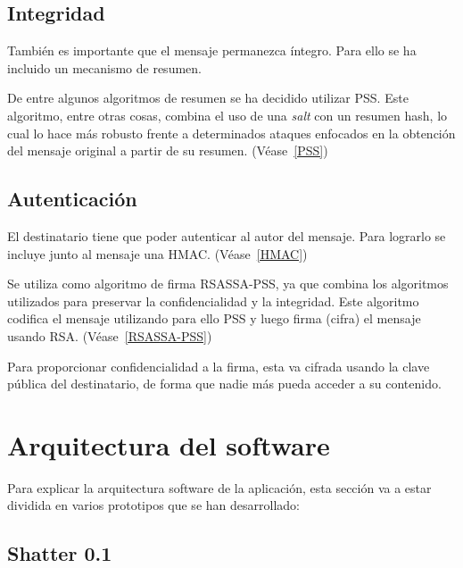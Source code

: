 \subsection{Integridad}

También es importante que el mensaje permanezca íntegro. Para ello se ha
incluido un mecanismo de resumen.

De entre algunos algoritmos de resumen se ha decidido utilizar PSS. Este
algoritmo, entre otras cosas, combina el uso de una \emph{salt} con un resumen
hash, lo cual lo hace más robusto frente a determinados ataques enfocados en la
obtención del mensaje original a partir de su resumen. (Véase~\ref{PSS})

\subsection{Autenticación}

El destinatario tiene que poder autenticar al autor del mensaje. Para lograrlo
se incluye junto al mensaje una HMAC. (Véase~\ref{HMAC})

Se utiliza como algoritmo de firma RSASSA-PSS, ya que combina los algoritmos
utilizados para preservar la confidencialidad y la integridad. Este algoritmo
codifica el mensaje utilizando para ello PSS y luego firma (cifra) el mensaje
usando RSA. (Véase~\ref{RSASSA-PSS})

Para proporcionar confidencialidad a la firma, esta va cifrada usando la clave
pública del destinatario, de forma que nadie más pueda acceder a su contenido.


\section{Arquitectura del software}

Para explicar la arquitectura software de la aplicación, esta sección va a estar dividida en varios
prototipos que se han desarrollado:

\subsection{Shatter 0.1}

